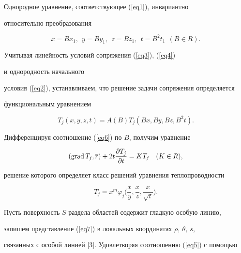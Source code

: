 \begin{pf}


Однородное уравнение, соответствующее (\ref{eq1}), инвариантно 


относительно преобразования


$$


x=Bx_{1},\ \ y=By_{1},\ \ z=Bz_{1},\ \ t=B^{2}t_{1}\ \ ({B \in R} ).


$$


Учитывая линейность условий сопряжения (\ref{eq3}), (\ref{eq4})


и однородность начального 


условия (\ref{eq2}), устанавливаем, что решение задачи сопряжения определяется 


функциональным уравнением


\begin{equation}


\label{eq6}


T_{j} ({x,y,z,t})=A ({B})T_{j} ({Bx,By,Bz,B^{2}t}).


\end{equation}





Дифференцируя соотношение (\ref{eq6}) по $B$, получим уравнение


$$


({\grad T_{j} ,\overline {r}})+2t\frac{{\partial T_{j} 


}}{{\partial t}}=KT_{j}\quad ({K \in R}),


$$


решение которого определяет класс решений уравнения теплопроводности


\begin{equation}


\label{eq7}


T_{j}=x^{m}\varphi_{j} \bigg(


{\frac{{x}}{{y}},\frac{{x}}{{z}},\frac{{x}}{{\sqrt {t}}}}\bigg).


\end{equation}





Пусть поверхность $S$ раздела областей содержит гладкую особую линию, 


запишем представление (\ref{eq7}) в локальных координатах $\rho,\ \theta,\ s$, 


связанных с особой линией [3]. Удовлетворяя соотношению (\ref{eq5}) с помощью



\end{pf}

